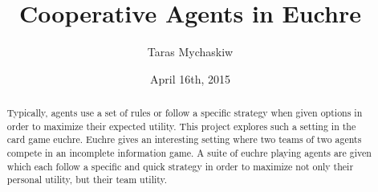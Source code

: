 \documentclass[12pt]{article}
\title{Cooperative Agents in Euchre}
\author{Taras Mychaskiw}
\date{April 16th, 2015}
\begin{document}
\maketitle

    \begin{abstract}
        Typically, agents use a set of rules or follow a specific strategy when given options in order to maximize their expected utility.
        This project explores such a setting in the card game euchre. Euchre gives an interesting setting where two teams of two agents
        compete in an incomplete information game. A suite of euchre playing agents are given which each follow a specific
        and quick strategy in order to maximize not only their personal utility, but their team utility.
    \end{abstract}
    
    \setcounter{tocdepth}{1}
    \thispagestyle{empty}
    \tableofcontents
    \clearpage
    \setcounter{page}{1}
    
    
    
    
    
    
    
    
    
    
    
    
    
\end{document}
